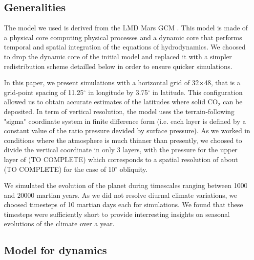 \label{sc:model}
\label{sc:physi}


\subsection{Generalities}

\label{sc:dynam}
\label{sc:dynamic}

The model we used is derived from the LMD Mars GCM \cite[]{Forg:99}. This model is made of a
physical core computing physical processes and a dynamic core that performs temporal and 
spatial integration of the equations of hydrodynamics. We choosed to drop the dynamic core of
the initial model and replaced it with a simpler redistribution scheme detailled below in 
order to ensure quicker simulations.

In this paper, we present simulations with a horizontal grid of 32$\times$48, that is a 
grid-point spacing of 11.25$^{\circ}$ in longitude by 3.75$^{\circ}$ in latitude. This 
configuration allowed us to obtain accurate estimates of the latitudes where solid CO$_2$
can be deposited. In term of vertical resolution, the model uses the terrain-following 
"sigma" coordinate system in finite difference form (i.e. each layer is defined by a 
constant value of the ratio pressure devided by surface pressure). As we worked in 
conditions where the atmosphere is much thinner than presently, we choosed to divide the
vertical coordinate in only 3 layers, with the pressure for the upper layer of %
(TO COMPLETE)
which corresponds to a spatial resolution of about %
(TO COMPLETE)
for the case of 10$^{\circ}$ obliquity.

We simulated the evolution of the planet during timescales ranging between 1000 and 20000
martian years. As we did not resolve diurnal climate variations, we choosed timesteps
of 10 martian days each for simulations. We found that these timesteps were sufficiently 
short to provide interresting insights on seasonal evolutions of the climate over a year.


\subsection{Model for dynamics}
\label{sc:model_dynamics}

